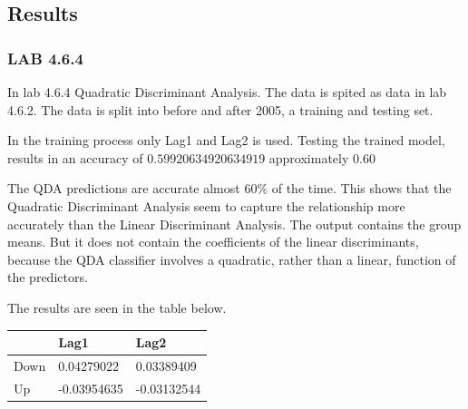 \subsection{Results}
\subsubsection*{LAB 4.6.4}
In lab 4.6.4 Quadratic Discriminant Analysis. The data is spited as data in lab 4.6.2. The data is split into before and after 2005, a training and testing set.

In the training process only Lag1 and Lag2 is used. Testing the trained model, results in an accuracy of $0.59920634920634919$ approximately $0.60$

The QDA predictions are accurate almost $60\%$ of the time. This shows that the Quadratic Discriminant Analysis seem to capture the relationship more accurately than the Linear Discriminant Analysis. The output contains the group means. But it does not contain the coefficients of the linear discriminants, because the QDA classifier involves a quadratic, rather than a linear, function of the predictors.

The results are seen in the table below.

\begin{longtable}[]{@{}lll@{}}
	\toprule
	& Lag1 & Lag2\tabularnewline
	\midrule
	\endhead
	Down & 0.04279022 & 0.03389409\tabularnewline
	Up & -0.03954635 & -0.03132544\tabularnewline
	\bottomrule
\end{longtable}